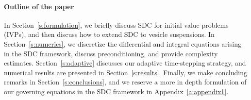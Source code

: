 \paragraph{Outline of the paper}
In Section~\ref{s:formulation}, we briefly discuss SDC for initial
value problems (IVPs), and then discuss how to extend SDC to vesicle
suspensions.  In Section~\ref{s:numerics}, we discretize the
differential and integral equations arising in the SDC framework,
discuss preconditioning, and provide complexity estimates.
Section~\ref{s:adaptive} discusses our adaptive time-stepping strategy,
and numerical results are presented in Section~\ref{s:results}.
Finally, we make concluding remarks in Section~\ref{s:conclusions}, and
we reserve a more in depth formulation of our governing equations in
the SDC framework in Appendix~\ref{a:appendix1}.

